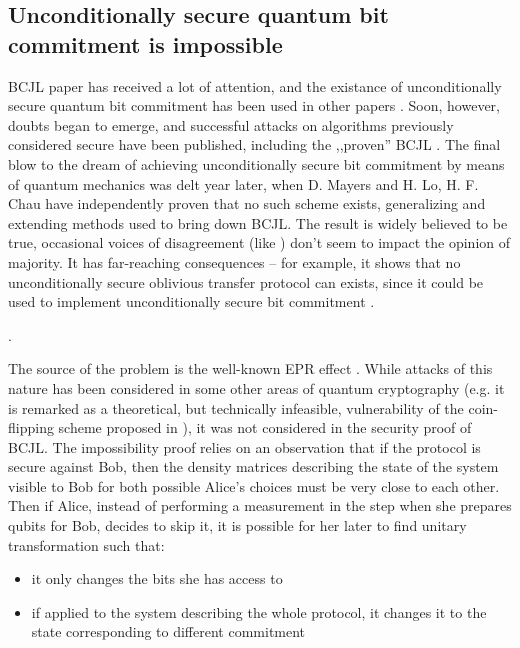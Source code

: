 \documentclass[10pt]{article}
\begin{document}
\subsection*{Unconditionally secure quantum bit commitment is impossible}

BCJL paper has received a lot of attention, and the existance of unconditionally secure quantum bit
commitment has been used in other papers \cite{Yao95}. Soon, however, doubts began to emerge, and
successful attacks on algorithms previously considered secure have been published, including the
,,proven'' BCJL \cite{Lo96,Mayers96}\footnotemark. The final blow to the dream of achieving unconditionally
secure bit commitment by means of quantum mechanics was delt year later, when D. Mayers \cite{Mayers97}
and H. Lo, H. F. Chau \cite{Lo98} have independently proven that no such scheme exists, generalizing
and extending methods used to bring down BCJL. The result is widely believed to be true, occasional
voices of disagreement (like \cite{Yuen01}) don't seem to impact the opinion of majority. It has
far-reaching consequences -- for example, it shows that no unconditionally secure oblivious transfer
protocol can exists, since it could be used to implement unconditionally secure bit commitment
\cite{Crepeau88}.

. 

The source of the problem is the well-known EPR effect \cite{EPR}. While  attacks of this nature has
been considered in some other areas of quantum cryptography (e.g. it is remarked as a theoretical,
but technically infeasible, vulnerability of the coin-flipping scheme proposed in \cite{bb84}),
it was not considered in the security proof of BCJL. The impossibility proof relies on an observation
that if the protocol is secure against Bob, then the density matrices describing the state of the
system visible to Bob for both possible Alice's choices must be very close to each other. Then if 
Alice, instead of performing a measurement in the step when she prepares qubits for Bob, decides to
skip it, it is possible for her later to find unitary transformation such that:
\begin{itemize}
  \item it only changes the bits she has access to
  \item if applied to the system describing the whole protocol, it changes it to the state 
    corresponding to different commitment
\end{itemize}
\end{document}
